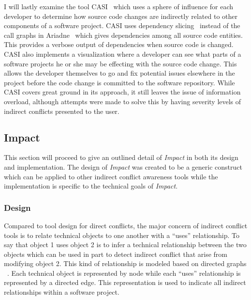 I will lastly examine the tool CASI~\cite{Servant:2010:CPI} which uses
a sphere of influence for each developer to determine how source code
changes are indirectly related to other components of a software project.
CASI uses dependency slicing~\cite{Bajracharya:2009:SIS} instead of the 
call graphs in Ariadne~\cite{Trainer:2005:BGT} which gives dependencies among
all source code entities. This provides a verbose output of dependencies when
source code is changed. CASI also implements a visualization where
a developer can see what parts of a software projects he or she may be effecting
with the source code change. This allows the developer themselves to go and fix
potential issues elsewhere in the project before the code change is committed
to the software repository. While CASI covers great ground in its approach,
it still leaves the issue of information overload, although attempts were made
to solve this by having severity levels of indirect conflicts presented to
the user.

\subsection{Impact}
This section will proceed to give an outlined detail of \textit{Impact} in both its
design and implementation. The design of \textit{Impact} was created to be
a generic construct which can be applied to other indirect conflict 
awareness tools while the implementation is specific to the technical
goals of \textit{Impact}.

\subsubsection{Design}
Compared to tool design for direct conflicts, the major concern of 
indirect conflict tools is to relate technical objects to one another
with a ``uses'' relationship. To say that object 1 uses object 2 is to infer
a technical relationship between the two objects which can be used
in part to detect indirect conflict that arise from modifying object
2. This kind of relationship is modeled based on directed graphs ~\cite{Horwitz:1992:UPD}. 
Each technical object is represented by node while each ``uses''
relationship is represented by a directed edge. This representation
is used to indicate all indirect relationships within a software project.


